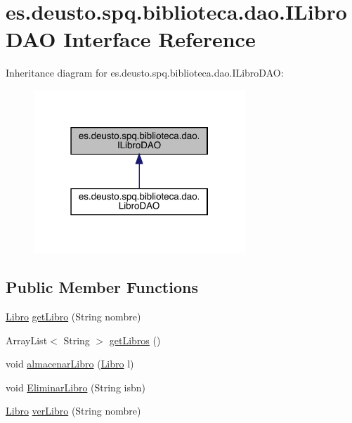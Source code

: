 \hypertarget{interfacees_1_1deusto_1_1spq_1_1biblioteca_1_1dao_1_1_i_libro_d_a_o}{}\section{es.\+deusto.\+spq.\+biblioteca.\+dao.\+I\+Libro\+D\+AO Interface Reference}
\label{interfacees_1_1deusto_1_1spq_1_1biblioteca_1_1dao_1_1_i_libro_d_a_o}


Inheritance diagram for es.\+deusto.\+spq.\+biblioteca.\+dao.\+I\+Libro\+D\+AO\+:
\nopagebreak
\begin{figure}[H]
\begin{center}
\leavevmode
\includegraphics[width=226pt]{interfacees_1_1deusto_1_1spq_1_1biblioteca_1_1dao_1_1_i_libro_d_a_o__inherit__graph}
\end{center}
\end{figure}
\subsection*{Public Member Functions}
\begin{DoxyCompactItemize}
\item 
\mbox{\hyperlink{classes_1_1deusto_1_1spq_1_1biblioteca_1_1data_1_1_libro}{Libro}} \mbox{\hyperlink{interfacees_1_1deusto_1_1spq_1_1biblioteca_1_1dao_1_1_i_libro_d_a_o_a1406f445c6462b6ef7a6d53422650f20}{get\+Libro}} (String nombre)
\item 
Array\+List$<$ String $>$ \mbox{\hyperlink{interfacees_1_1deusto_1_1spq_1_1biblioteca_1_1dao_1_1_i_libro_d_a_o_ad8d7e48cb052174072938ca00ace7fea}{get\+Libros}} ()
\item 
void \mbox{\hyperlink{interfacees_1_1deusto_1_1spq_1_1biblioteca_1_1dao_1_1_i_libro_d_a_o_ad8e76a77aa5fc0900142921d7efb79f0}{almacenar\+Libro}} (\mbox{\hyperlink{classes_1_1deusto_1_1spq_1_1biblioteca_1_1data_1_1_libro}{Libro}} l)
\item 
void \mbox{\hyperlink{interfacees_1_1deusto_1_1spq_1_1biblioteca_1_1dao_1_1_i_libro_d_a_o_afb545c6295192e9cde403bf72dbc5818}{Eliminar\+Libro}} (String isbn)
\item 
\mbox{\hyperlink{classes_1_1deusto_1_1spq_1_1biblioteca_1_1data_1_1_libro}{Libro}} \mbox{\hyperlink{interfacees_1_1deusto_1_1spq_1_1biblioteca_1_1dao_1_1_i_libro_d_a_o_ae390d687e8e4ec02a401291da5076062}{ver\+Libro}} (String nombre)
\end{DoxyCompactItemize}


